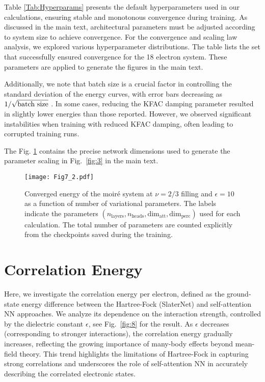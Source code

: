 \documentclass[
 reprint,
 amsmath,amssymb,
 aps, prx,
floatfix,longbibliography,
]{revtex4-2}
\newcommand{\FNN}{self-attention NN }
\begin{document}
\begin{appendix}
Table \ref{Tab:Hyperparams} presents the default hyperparameters used in our calculations, ensuring stable and monotonous convergence during training. As discussed in the main text, architectural parameters must be adjusted according to system size to achieve convergence. For the convergence and scaling law analysis, we explored various hyperparameter distributions. The table lists the set that successfully ensured convergence for the 18 electron system. These parameters are applied to generate the figures in the main text. 

Additionally, we note that batch size is a crucial factor in controlling the standard deviation of the energy curves, with error bars decreasing as $1/\sqrt{{\rm batch\  size}}$
 . In some cases, reducing the KFAC damping parameter resulted in slightly lower energies than those reported. However, we observed significant instabilities when training with reduced KFAC damping, often leading to corrupted training runs.


The Fig. \ref{fig:7_2} contains the precise network dimensions used to generate the parameter scaling in Fig.~\ref{fig:3} in the main text.



\begin{figure}
    \centering
    \texttt{[image: Fig7\_2.pdf]}
    \caption{ Converged energy of the moir\'e system at $\nu=2/3$ filling and $\epsilon=10$ as a function of number of variational parameters. The labels indicate the parameters $(n_\text{layers}, n_\text{heads},  \text{dim}_\text{att}, \text{dim}_\text{perc})$ used for each calculation. The total number of parameters are counted explicitly from the checkpoints saved during the training. 
    }
    \label{fig:7_2}
\end{figure}



\section{Correlation Energy}
\label{app:Correlation}

Here, we investigate the correlation energy per electron, defined as the ground-state energy difference between the Hartree-Fock (SlaterNet) and \FNN approaches. We analyze its dependence on the interaction strength, controlled by the dielectric constant $\epsilon$, see Fig.~\ref{fig:8} for the result. As $\epsilon$ decreases (corresponding to stronger interactions), the correlation energy gradually increases, reflecting the growing importance of many-body effects beyond mean-field theory. This trend highlights the limitations of Hartree-Fock in capturing strong correlations and underscores the role of \FNN in accurately describing the correlated electronic states. 



\end{appendix}
\end{document}
